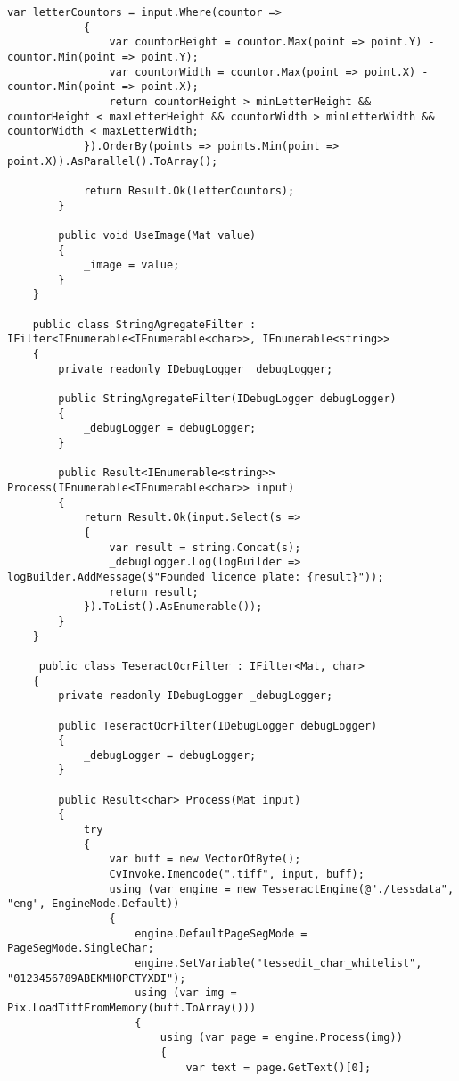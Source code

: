 \begin{lstlisting}[style=fsharpstyle,caption={Исходный код}, label=lst:recognition_result_handler]
            var letterCountors = input.Where(countor =>
            {
                var countorHeight = countor.Max(point => point.Y) - countor.Min(point => point.Y);
                var countorWidth = countor.Max(point => point.X) - countor.Min(point => point.X);
                return countorHeight > minLetterHeight && countorHeight < maxLetterHeight && countorWidth > minLetterWidth && countorWidth < maxLetterWidth;
            }).OrderBy(points => points.Min(point => point.X)).AsParallel().ToArray();

            return Result.Ok(letterCountors);
        }

        public void UseImage(Mat value)
        {
            _image = value;
        }
    }

    public class StringAgregateFilter : IFilter<IEnumerable<IEnumerable<char>>, IEnumerable<string>>
    {
        private readonly IDebugLogger _debugLogger;

        public StringAgregateFilter(IDebugLogger debugLogger)
        {
            _debugLogger = debugLogger;
        }

        public Result<IEnumerable<string>> Process(IEnumerable<IEnumerable<char>> input)
        {
            return Result.Ok(input.Select(s =>
            {
                var result = string.Concat(s);
                _debugLogger.Log(logBuilder => logBuilder.AddMessage($"Founded licence plate: {result}"));
                return result;
            }).ToList().AsEnumerable());
        }
    }

     public class TeseractOcrFilter : IFilter<Mat, char>
    {
        private readonly IDebugLogger _debugLogger;

        public TeseractOcrFilter(IDebugLogger debugLogger)
        {
            _debugLogger = debugLogger;
        }

        public Result<char> Process(Mat input)
        {
            try
            {
                var buff = new VectorOfByte();
                CvInvoke.Imencode(".tiff", input, buff);
                using (var engine = new TesseractEngine(@"./tessdata", "eng", EngineMode.Default))
                {
                    engine.DefaultPageSegMode = PageSegMode.SingleChar;
                    engine.SetVariable("tessedit_char_whitelist", "0123456789ABEKMHOPCTYXDI");
                    using (var img = Pix.LoadTiffFromMemory(buff.ToArray()))
                    {
                        using (var page = engine.Process(img))
                        {
                            var text = page.GetText()[0];


\end{lstlisting}
